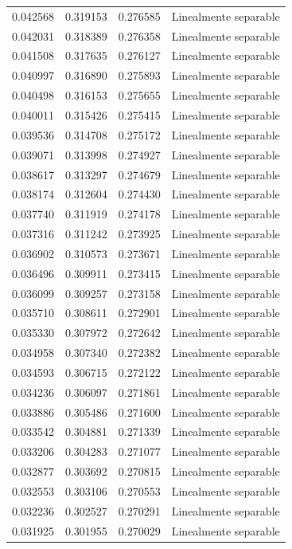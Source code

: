 \begin{tabular}{llll}
0.042568 & 0.319153 & 0.276585 & Linealmente separable \\
0.042031 & 0.318389 & 0.276358 & Linealmente separable \\
0.041508 & 0.317635 & 0.276127 & Linealmente separable \\
0.040997 & 0.316890 & 0.275893 & Linealmente separable \\
0.040498 & 0.316153 & 0.275655 & Linealmente separable \\
0.040011 & 0.315426 & 0.275415 & Linealmente separable \\
0.039536 & 0.314708 & 0.275172 & Linealmente separable \\
0.039071 & 0.313998 & 0.274927 & Linealmente separable \\
0.038617 & 0.313297 & 0.274679 & Linealmente separable \\
0.038174 & 0.312604 & 0.274430 & Linealmente separable \\
0.037740 & 0.311919 & 0.274178 & Linealmente separable \\
0.037316 & 0.311242 & 0.273925 & Linealmente separable \\
0.036902 & 0.310573 & 0.273671 & Linealmente separable \\
0.036496 & 0.309911 & 0.273415 & Linealmente separable \\
0.036099 & 0.309257 & 0.273158 & Linealmente separable \\
0.035710 & 0.308611 & 0.272901 & Linealmente separable \\
0.035330 & 0.307972 & 0.272642 & Linealmente separable \\
0.034958 & 0.307340 & 0.272382 & Linealmente separable \\
0.034593 & 0.306715 & 0.272122 & Linealmente separable \\
0.034236 & 0.306097 & 0.271861 & Linealmente separable \\
0.033886 & 0.305486 & 0.271600 & Linealmente separable \\
0.033542 & 0.304881 & 0.271339 & Linealmente separable \\
0.033206 & 0.304283 & 0.271077 & Linealmente separable \\
0.032877 & 0.303692 & 0.270815 & Linealmente separable \\
0.032553 & 0.303106 & 0.270553 & Linealmente separable \\
0.032236 & 0.302527 & 0.270291 & Linealmente separable \\
0.031925 & 0.301955 & 0.270029 & Linealmente separable \\

\end{tabular}
